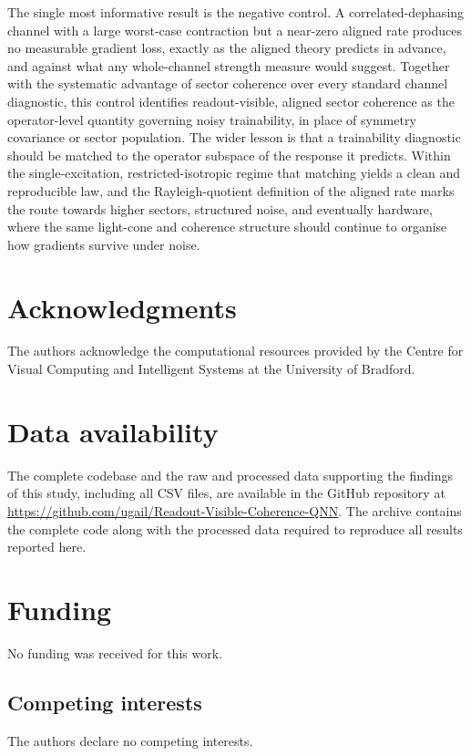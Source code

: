 \documentclass{article}
\begin{document}
The single most informative result is the negative control. A correlated-dephasing channel with a large worst-case contraction but a near-zero aligned rate produces no measurable gradient loss, exactly as the aligned theory predicts in advance, and against what any whole-channel strength measure would suggest. Together with the systematic advantage of sector coherence over every standard channel diagnostic, this control identifies readout-visible, aligned sector coherence as the operator-level quantity governing noisy trainability, in place of symmetry covariance or sector population. The wider lesson is that a trainability diagnostic should be matched to the operator subspace of the response it predicts. Within the single-excitation, restricted-isotropic regime that matching yields a clean and reproducible law, and the Rayleigh-quotient definition of the aligned rate marks the route towards higher sectors, structured noise, and eventually hardware, where the same light-cone and coherence structure should continue to organise how gradients survive under noise.

\section*{Acknowledgments}
The authors acknowledge the computational resources provided by the Centre for Visual Computing and Intelligent Systems at the University of Bradford.

\section*{Data availability}\label{sec:data}
The complete codebase and the raw and processed data supporting the findings of this study, including all CSV files, are available in the GitHub repository at \url{https://github.com/ugail/Readout-Visible-Coherence-QNN}. The archive contains the complete code along with the processed data required to reproduce all results reported here.

\section*{Funding}
No funding was received for this work.

\subsection*{Competing interests}
The authors declare no competing interests.
\end{document}
